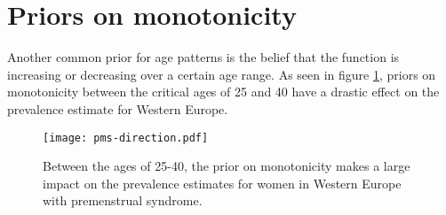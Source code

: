 \section{Priors on monotonicity}
Another common prior for age patterns is the belief that the function is increasing or decreasing over a certain age range.  As seen in figure \ref{fig:app-knot_loc}, priors on monotonicity between the critical ages of 25 and 40 have a drastic effect on the prevalence estimate for Western Europe.

    \begin{figure}
        \begin{center}
            \texttt{[image: pms-direction.pdf]}
        \end{center}
        \caption{Between the ages of 25-40, the prior on monotonicity makes a large impact on the prevalence estimates for women in Western Europe with premenstrual syndrome.}
        \label{fig:app-knot_loc}
    \end{figure} 